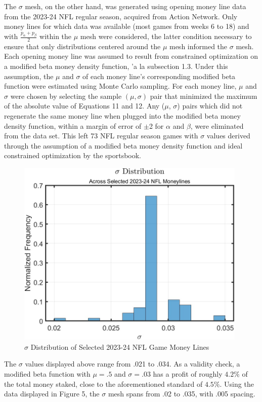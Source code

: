\documentclass[sn-mathphys-num]{sn-jnl}
\theoremstyle{thmstyleone}%
\theoremstyle{thmstyletwo}%
\theoremstyle{thmstylethree}%
\begin{document}
The $\sigma$ mesh, on the other hand, was generated using opening money line data from the 2023-24 NFL regular season, acquired from Action Network. Only money lines for which data was available (most games from weeks 6 to 18) and with $\frac{p_\alpha+p_\beta}{2}$ within the $\mu$ mesh were considered, the latter condition necessary to ensure that only distributions centered around the $\mu$ mesh informed the $\sigma$ mesh. Each opening money line was assumed to result from constrained optimization on a modified beta money density function, \a'a la subsection 1.3. Under this assumption, the $\mu$ and $\sigma$ of each money line's corresponding modified beta function were estimated using Monte Carlo sampling. For each money line, $\mu$ and $\sigma$ were chosen by selecting the sample $(\mu,\sigma)$ pair that minimized the maximum of the absolute value of Equations 11 and 12. Any ($\mu$, $\sigma$) pairs which did not regenerate the same money line when plugged into the modified beta money density function, within a margin of error of $\pm$2 for $\alpha$ and $\beta$, were eliminated from the data set. This left 73 NFL regular season games with $\sigma$ values derived through the assumption of a modified beta money density function and ideal constrained optimization by the sportsbook.

\begin{figure}[H]
	\centering
	\includegraphics[width=11cm]{Selected NFL Sigma Distribution}
	\caption{$\sigma$ Distribution of Selected 2023-24 NFL Game Money Lines}
\end{figure}

The $\sigma$ values displayed above range from .021 to .034. As a validity check, a modified beta function with $\mu = .5$ and $\sigma = .03$ has a profit of roughly $4.2\%$ of the total money staked, close to the aforementioned standard of $4.5\%$. Using the data displayed in Figure 5, the $\sigma$ mesh spans from .02 to .035, with .005 spacing.
\end{document}
